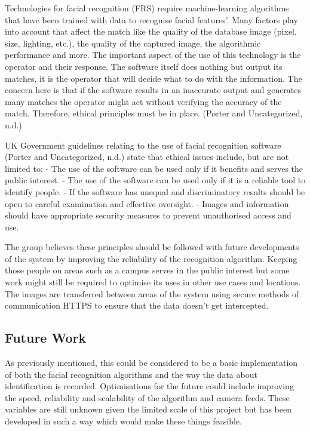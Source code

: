 \documentclass[
  english,
  a4paper,
,tablecaptionabove
]{scrartcl}
\begin{document}
Technologies for facial recognition (FRS) require machine-learning
algorithms that have been trained with data to recognise facial
features'. Many factors play into account that affect the match like the
quality of the database image (pixel, size, lighting, etc.), the quality
of the captured image, the algorithmic performance and more. The
important aspect of the use of this technology is the operator and their
response. The software itself does nothing but output its matches, it is
the operator that will decide what to do with the information. The
concern here is that if the software results in an inaccurate output and
generates many matches the operator might act without verifying the
accuracy of the match. Therefore, ethical principles must be in place.
(Porter and Uncategorized, n.d.)

UK Government guidelines relating to the use of facial recognition
software (Porter and Uncategorized, n.d.) state that ethical issues
include, but are not limited to: - The use of the software can be used
only if it benefits and serves the public interest. - The use of the
software can be used only if it is a reliable tool to identify people. -
If the software has unequal and discriminatory results should be open to
careful examination and effective oversight. - Images and information
should have appropriate security measures to prevent unauthorised access
and use.

The group believes these principles should be followed with future
developments of the system by improving the reliability of the
recognition algorithm. Keeping those people on areas such as a campus
serves in the public interest but some work might still be required to
optimise its uses in other use cases and locations. The images are
transferred between areas of the system using secure methods of
communication HTTPS to ensure that the data doesn't get intercepted.

\hypertarget{future-work}{%
\subsection{Future Work}\label{future-work}}

As previously mentioned, this could be considered to be a basic
implementation of both the facial recognition algorithms and the way the
data about identification is recorded. Optimisations for the future
could include improving the speed, reliability and scalability of the
algorithm and camera feeds. These variables are still unknown given the
limited scale of this project but has been developed in such a way which
would make these things feasible.
\end{document}

